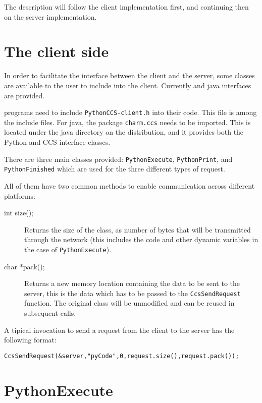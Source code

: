 The description will follow the client implementation first, and continuing then
on the server implementation.


\section{The client side}

\label{pythonClient}

In order to facilitate the interface between the client and the server, some
classes are available to the user to include into the client. Currently \CC{} and
java interfaces are provided.

\CC{} programs need to include \texttt{PythonCCS-client.h} into their
code. This file is among the \charmpp{} include files. For java, the package
\texttt{charm.ccs} needs to be imported. This is located under the java
directory on the \charmpp{} distribution, and it provides both the Python and
CCS interface classes.

There are three main classes provided: \texttt{PythonExecute},
\texttt{PythonPrint}, and \texttt{PythonFinished} which are used for the three
different types of request.

All of them have two common methods to enable communication across different platforms:

\begin{description}

\item[int size();]
Returns the size of the class, as number of bytes that will be
transmitted through the network (this includes the code and other dynamic
variables in the case of \texttt{PythonExecute}).

\item[char *pack();]
Returns a new memory location containing the data to be sent to the server, this
is the data which has to be passed to the \texttt{CcsSendRequest} function. The
original class will be unmodified and can be reused in subsequent calls.

\end{description}

A tipical invocation to send a request from the client to the server has the
following format:

\begin{alltt}
CcsSendRequest (&server, "pyCode", 0, request.size(), request.pack());
\end{alltt}

\section{PythonExecute}
\label{pythonExecute}

